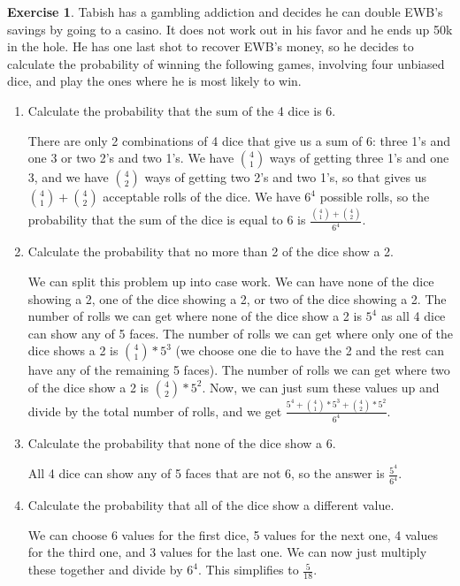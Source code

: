 \documentclass[12pt]{amsart}
\theoremstyle{definition}
\newtheorem{exercise}{Exercise}
\numberwithin{equation}{section}
\theoremstyle{plain}
\begin{document}
 
\begin{exercise}
Tabish has a gambling addiction and decides he can double EWB's savings by going to a casino. It does not work out in his favor and he ends up 50k in the hole. He has one last shot to recover EWB's money, so he decides to calculate the probability of winning the following games, involving four unbiased dice, and play the ones where he is most likely to win.
\begin{enumerate}[label=\Alph*.)]
\item Calculate the probability that the sum of the 4 dice is 6. 
\begin{answer}There are only 2 combinations of 4 dice that give us a sum of 6: three 1's and one 3 or two 2's and two 1's. We have $\binom{4}{1}$ ways of getting three 1's and one 3, and we have $\binom{4}{2}$ ways of getting two 2's and two 1's, so that gives us $\binom{4}{1}+\binom{4}{2}$ acceptable rolls of the dice. We have $6^4$ possible rolls, so the probability that the sum of the dice is equal to 6 is $\frac{\binom{4}{1}+\binom{4}{2}}{6^4}$.
\end{answer}
\item Calculate the probability that no more than 2 of the dice show a 2. 
\begin{answer}We can split this problem up into case work. We can have none of the dice showing a 2, one of the dice showing a 2, or two of the dice showing a 2. The number of rolls we can get where none of the dice show a 2 is $5^4$ as all 4 dice can show any of 5 faces. The number of rolls we can get where only one of the dice shows a 2 is $\binom{4}{1}*5^3$ (we choose one die to have the 2 and the rest can have any of the remaining 5 faces). The number of rolls we can get where two of the dice show a 2 is $\binom{4}{2}*5^2$. Now, we can just sum these values up and divide by the total number of rolls, and we get $\frac{5^4 + \binom{4}{1}*5^3 + \binom{4}{2}*5^2}{6^4}$.
\end{answer}
\item Calculate the probability that none of the dice show a 6.
\begin{answer}
All 4 dice can show any of 5 faces that are not 6, so the answer is $\frac{5^4}{6^4}$.
\end{answer}
\item Calculate the probability that all of the dice show a different value.
\begin{answer}
We can choose 6 values for the first dice, 5 values for the next one, 4 values for the third one, and 3 values for the last one. We can now just multiply these together and divide by $6^4$. This simplifies to $\frac{5}{18}$.

\end{answer}
\end{enumerate}
\end{exercise}
\end{document}
